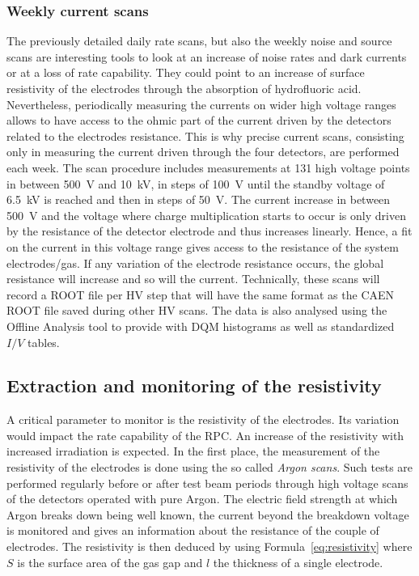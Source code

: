 		\subsubsection{Weekly current scans}
		\label{chapt5:sssec:currentscan}
		
	The previously detailed daily rate scans, but also the weekly noise and source scans are interesting tools to look at an increase of noise rates and dark currents or at a loss of rate capability. They could point to an increase of surface resistivity of the electrodes through the absorption of hydrofluoric acid. Nevertheless, periodically measuring the currents on wider high voltage ranges allows to have access to the ohmic part of the current driven by the detectors related to the electrodes resistance. This is why precise current scans, consisting only in measuring the current driven through the four detectors, are performed each week. The scan procedure includes measurements at 131 high voltage points in between \SI{500}{V} and \SI{10}{kV}, in steps of \SI{100}{V} until the standby voltage of \SI{6.5}{kV} is reached and then in steps of \SI{50}{V}. The current increase in between \SI{500}{V} and the voltage where charge multiplication starts to occur is only driven by the resistance of the detector electrode and thus increases linearly. Hence, a fit on the current in this voltage range gives access to the resistance of the system electrodes/gas. If any variation of the electrode resistance occurs, the global resistance will increase and so will the current. Technically, these scans will record a ROOT file per HV step that will have the same format as the CAEN ROOT file saved during other HV scans. The data is also analysed using the Offline Analysis tool to provide with DQM histograms as well as standardized $I/V$ tables.
	
	\subsection{Extraction and monitoring of the resistivity}
	\label{chapt5:ssec:resistivity}
	
	A critical parameter to monitor is the resistivity of the electrodes. Its variation would impact the rate capability of the RPC. An increase of the resistivity with increased irradiation is expected. In the first place, the measurement of the resistivity of the electrodes is done using the so called \textit{Argon scans}. Such tests are performed regularly before or after test beam periods through high voltage scans of the detectors operated with pure Argon. The electric field strength at which Argon breaks down being well known, the current beyond the breakdown voltage is monitored and gives an information about the resistance of the couple of electrodes. The resistivity is then deduced by using Formula~\ref{eq:resistivity} where $S$ is the surface area of the gas gap and $l$ the thickness of a single electrode.
	
